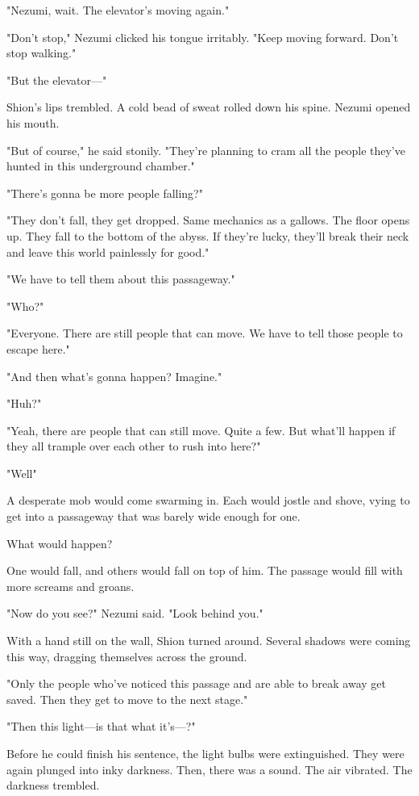 "Nezumi, wait. The elevator's moving again."

"Don't stop," Nezumi clicked his tongue irritably. "Keep moving forward.
Don't stop walking."

"But the elevator---"

Shion's lips trembled. A cold bead of sweat rolled down his spine.
Nezumi opened his mouth.

"But of course," he said stonily. "They're planning to cram all the
people they've hunted in this underground chamber."

"There's gonna be more people falling?"

"They don't fall, they get dropped. Same mechanics as a gallows. The
floor opens up. They fall to the bottom of the abyss. If they're lucky,
they'll break their neck and leave this world painlessly for good."

"We have to tell them about this passageway."

"Who?"

"Everyone. There are still people that can move. We have to tell those
people to escape here."

"And then what's gonna happen? Imagine."

"Huh\el ?"

"Yeah, there are people that can still move. Quite a few. But what'll
happen if they all trample over each other to rush into here?"

"Well\el "

A desperate mob would come swarming in. Each would jostle and shove,
vying to get into a passageway that was barely wide enough for one.

What would happen?

One would fall, and others would fall on top of him. The passage would
fill with more screams and groans.

"Now do you see?" Nezumi said. "Look behind you."

With a hand still on the wall, Shion turned around. Several shadows were
coming this way, dragging themselves across the ground.

"Only the people who've noticed this passage and are able to break away
get saved. Then they get to move to the next stage."

"Then this light---is that what it's---?"

Before he could finish his sentence, the light bulbs were extinguished.
They were again plunged into inky darkness. Then, there was a sound. The
air vibrated. The darkness trembled.

